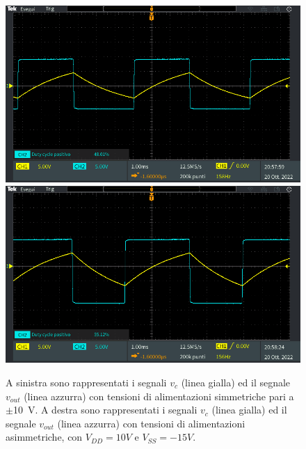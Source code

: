 \begin{figure}[h]
	\centering
	\includegraphics[width=0.496\linewidth]{./ImageFiles/Laboratorio 3/TEK00021.PNG}
	\includegraphics[width=0.496\linewidth]{./ImageFiles/Laboratorio 3/TEK00022.PNG}
	\caption{A sinistra sono rappresentati i segnali $v_{c}$ (linea gialla) ed il segnale $v_{out}$ (linea azzurra) con tensioni di alimentazioni simmetriche pari a $\pm$\SI{10}{\volt}. A destra sono rappresentati i segnali $v_{c}$ (linea gialla) ed il segnale $v_{out}$ (linea azzurra) con tensioni di alimentazioni asimmetriche, con $V_{DD}=10V$ e  $V_{SS}=-15V$.}
	\label{fig:tensioni_sbilanciare}
\end{figure} 

